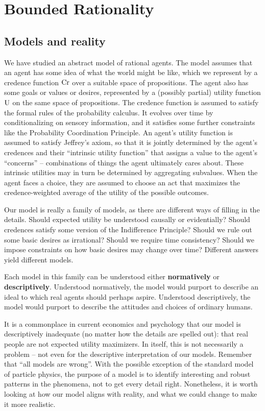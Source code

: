 \chapter{Bounded Rationality}

\section{Models and reality}

We have studied an abstract model of rational agents. The model assumes that an
agent has some idea of what the world might be like, which we represent by a
credence function $\text{Cr}$ over a suitable space of propositions. The agent also
has some goals or values or desires, represented by a (possibly partial) utility
function $\text{U}$ on the same space of propositions. The credence function is
assumed to satisfy the formal rules of the probability calculus. It evolves over
time by conditionalizing on sensory information, and it satisfies some further
constraints like the Probability Coordination Principle. An agent's utility
function is assumed to satisfy Jeffrey's axiom, so that it is jointly determined
by the agent's credences and their ``intrinsic utility function'' that assigns a
value to the agent's ``concerns'' -- combinations of things the agent ultimately
cares about. These intrinsic utilities may in turn be determined by aggregating
subvalues. When the agent faces a choice, they are assumed to choose an act that
maximizes the credence-weighted average of the utility of the possible outcomes.

Our model is really a family of models, as there are different ways of filling
in the details. Should expected utility be understood causally or evidentially?
Should credences satisfy some version of the Indifference Principle? Should we
rule out some basic desires as irrational? Should we require time consistency?
Should we impose constraints on how basic desires may change over time?
Different answers yield different models.

Each model in this family can be understood either \textbf{normatively} or
\textbf{descriptively}. Understood normatively, the model would purport to
describe an ideal to which real agents should perhaps aspire. Understood
descriptively, the model would purport to describe the attitudes and choices of
ordinary humans.

It is a commonplace in current economics and psychology that our model is
descriptively inadequate (no matter how the details are spelled out): that real
people are not expected utility maximizers. In itself, this is not necessarily a
problem -- not even for the descriptive interpretation of our models. Remember
that ``all models are wrong''. With the possible exception of the standard model
of particle physics, the purpose of a model is to identify interesting and
robust patterns in the phenomena, not to get every detail right. Nonetheless, it
is worth looking at how our model aligns with reality, and what we
could change to make it more realistic.

